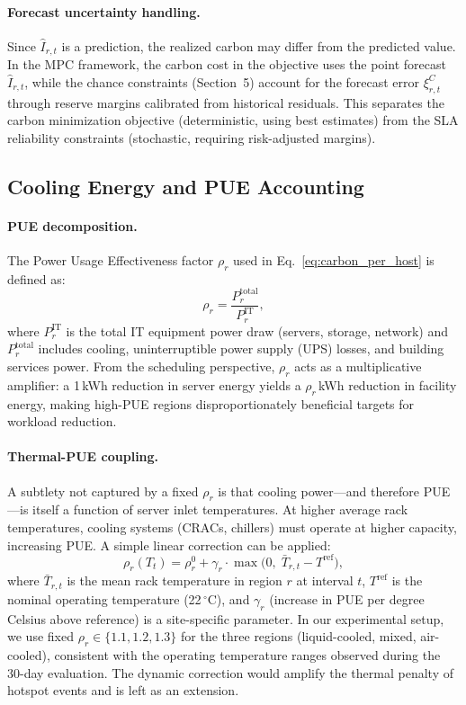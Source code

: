 \documentclass[a4paper,fleqn]{cas-dc}
\begin{document}
\paragraph{Forecast uncertainty handling.}
Since $\hat{I}_{r,t}$ is a prediction, the realized carbon may differ from the predicted value. In the MPC framework, the carbon cost in the objective uses the point forecast $\hat{I}_{r,t}$, while the chance constraints (Section~5) account for the forecast error $\xi^C_{r,t}$ through reserve margins calibrated from historical residuals. This separates the carbon minimization objective (deterministic, using best estimates) from the SLA reliability constraints (stochastic, requiring risk-adjusted margins).

\subsection{Cooling Energy and PUE Accounting}
\label{sec:pue}

\paragraph{PUE decomposition.}
The Power Usage Effectiveness factor $\rho_r$ used in Eq.~\eqref{eq:carbon_per_host} is defined as:
\begin{equation}
\label{eq:pue}
\rho_r = \frac{P^{\mathrm{total}}_r}{P^{\mathrm{IT}}_r},
\end{equation}
where $P^{\mathrm{IT}}_r$ is the total IT equipment power draw (servers, storage, network) and $P^{\mathrm{total}}_r$ includes cooling, uninterruptible power supply (UPS) losses, and building services power. From the scheduling perspective, $\rho_r$ acts as a multiplicative amplifier: a 1\,kWh reduction in server energy yields a $\rho_r$\,kWh reduction in facility energy, making high-PUE regions disproportionately beneficial targets for workload reduction.

\paragraph{Thermal-PUE coupling.}
A subtlety not captured by a fixed $\rho_r$ is that cooling power---and therefore PUE---is itself a function of server inlet temperatures. At higher average rack temperatures, cooling systems (CRACs, chillers) must operate at higher capacity, increasing PUE. A simple linear correction can be applied:
\begin{equation}
\label{eq:pue_dynamic}
\rho_r(T_t) = \rho^0_r + \gamma_r \cdot \max\!\bigl(0,\; \bar{T}_{r,t} - T^{\mathrm{ref}}\bigr),
\end{equation}
where $\bar{T}_{r,t}$ is the mean rack temperature in region $r$ at interval $t$, $T^{\mathrm{ref}}$ is the nominal operating temperature (22\,$^{\circ}$C), and $\gamma_r$ (increase in PUE per degree Celsius above reference) is a site-specific parameter. In our experimental setup, we use fixed $\rho_r \in \{1.1, 1.2, 1.3\}$ for the three regions (liquid-cooled, mixed, air-cooled), consistent with the operating temperature ranges observed during the 30-day evaluation. The dynamic correction would amplify the thermal penalty of hotspot events and is left as an extension.
\end{document}
